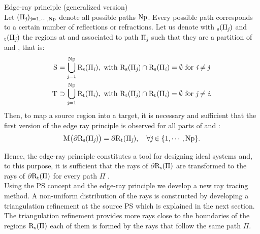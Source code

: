 \begin{lemma}{Edge-ray principle (generalized version)}\\
Let $(\Pi_{\textit{j}})_{\textit{j}=1, \cdots, \textrm{Np}}$ denote all possible paths $\textrm{Np}$.
Every possible path corresponds to a certain number of reflections or refractions.
Let us denote with $_\textrm{s}(\Pi_{\textit{j}})$ and 
$_\textrm{t}(\Pi_{\textit{j}})$ the regions at  and  associated to path $\Pi_{\textit{j}}$ such that they are a partition of  and , that is:
\begin{equation*}
\begin{aligned}
\mbox{$\textup{S}_{\textit{}}$} &= \bigcup_{\textit{j}=1}^{\textrm{Np}} \mbox{$\textup{R}$}_\textrm{s}(\Pi_{\textit{i}}), \mbox{ with } \mbox{$\textup{R}$}_\textrm{s}(\Pi_{\textit{j}})\cap \mbox{$\textup{R}$}_\textrm{s}(\Pi_{\textit{i}}) = \emptyset \mbox{ for } \textit{i}\neq \textit{j}\\
\mbox{$\textup{T}_{\textit{}}$} & \supset \bigcup_{\textit{j}=1}^{\textrm{Np}} \mbox{$\textup{R}$}_\textrm{t}(\Pi_{\textit{i}}), \mbox{ with } \mbox{$\textup{R}$}_\textrm{t}(\Pi_{\textit{j}})\cap \mbox{$\textup{R}$}_\textrm{t}(\Pi_{\textit{i}}) = \emptyset \mbox{ for } \textit{j}\neq \textit{i}.
\end{aligned}
\end{equation*} 
Then, to map a source region into a target, it is necessary and sufficient that the first version of the edge ray principle is observed for all parts of  and : 
\begin{equation*}
\mathrm{M}_{\textit{}}\big(\partial\mbox{$\textup{R}$}_\textrm{s}(\Pi_{\textit{j}})\big) = \partial\mbox{$\textup{R}$}_\textrm{t}(\Pi_{\textit{j}}), \quad \forall \textit{j}\in\{1, \cdots, \textrm{Np}\}.
\end{equation*}
\end{lemma}
Hence, the edge-ray principle constitutes a tool for designing ideal systems and, to this purpose, it is sufficient that the rays of $\partial\mbox{$\textup{R}$}_\textrm{s}(\Pi)$ are transformed to the rays of $\partial\mbox{$\textup{R}$}_\textrm{t}(\Pi)$ for every path $\Pi$ \cite{minano1992new}. 
\\ \indent Using the PS concept and the edge-ray principle we develop a new ray tracing method. 
A non-uniform distribution of the rays is constructed by developing a triangulation refinement at the source PS which is explained in the next section. 
The triangulation refinement provides more rays close to the boundaries of the regions $\mbox{$\textup{R}$}_\textrm{s}(\Pi)$ each of them is formed by the rays that follow the same path $\Pi$.
